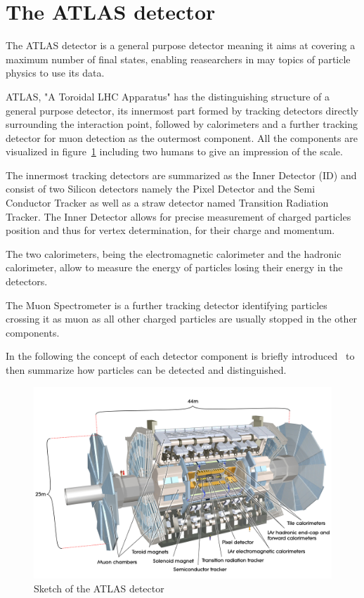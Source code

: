 \section{The ATLAS detector}

The ATLAS detector is a general purpose detector meaning it aims at covering a maximum number of final states, enabling reasearchers in may topics of particle physics to use its data.

ATLAS, "A Toroidal LHC Apparatus" has the distinguishing structure of a general purpose detector, its innermost part formed by tracking detectors directly surrounding the interaction point, followed by calorimeters and a further tracking detector for muon detection as the outermost component. All the components are visualized in figure~\ref{fig:atlas} including two humans to give an impression of the scale.

The innermost tracking detectors are summarized as the Inner Detector (ID) and consist of two Silicon detectors namely the Pixel Detector and the Semi Conductor Tracker as well as a straw detector named Transition Radiation Tracker. The Inner Detector allows for precise measurement of charged particles position and thus for vertex determination, for their charge and momentum.

The two calorimeters, being the electromagnetic calorimeter and the hadronic calorimeter, allow to measure the energy of particles losing their energy in the detectors.

The Muon Spectrometer is a further tracking detector identifying particles crossing it as muon as all other charged particles are usually stopped in the other components.

In the following the concept of each detector component is briefly introduced~\cite{wermes} to then summarize how particles can be detected and distinguished.



\begin{figure}[htbp]
  \centering
  \includegraphics[scale=0.15]{figures_LHC/atlas-detector}
  \caption[Sketch of the ATLAS detector]{Sketch of the ATLAS detector\cite{Pequenao:1095924}}
  \label{fig:atlas}
\end{figure}


